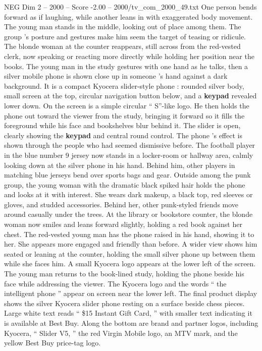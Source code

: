 \begin{textsample}{NEG Dim 2 – 2000 – Score -2.00 – 2000/tv\_com\_2000\_49.txt}
One person bends forward as if laughing, while another leans in with exaggerated body movement.
The young man stands in the middle, looking out of place among them.
The group ’s posture and gestures make him seem the target of teasing or ridicule.
The blonde woman at the counter reappears, still across from the red-vested clerk, now speaking or reacting more directly while holding her position near the books.
The young man in the study gestures with one hand as he talks, then a silver mobile phone is shown close up in someone ’s hand against a dark background.
It is a compact Kyocera slider-style phone : rounded silver body, small screen at the top, circular navigation button below, and a \textbf{keypad} revealed lower down.
On the screen is a simple circular “ S”-like logo.
He then holds the phone out toward the viewer from the study, bringing it forward so it fills the foreground while his face and bookshelves blur behind it.
The slider is open, clearly showing the \textbf{keypad} and central round control.
The phone ’s effect is shown through the people who had seemed dismissive before.
The football player in the blue number 9 jersey now stands in a locker-room or hallway area, calmly looking down at the silver phone in his hand.
Behind him, other players in matching blue jerseys bend over sports bags and gear.
Outside among the punk group, the young woman with the dramatic black spiked hair holds the phone and looks at it with interest.
She wears dark makeup, a black top, red sleeves or gloves, and studded accessories.
Behind her, other punk-styled friends move around casually under the trees.
At the library or bookstore counter, the blonde woman now smiles and leans forward slightly, holding a red book against her chest.
The red-vested young man has the phone raised in his hand, showing it to her.
She appears more engaged and friendly than before.
A wider view shows him seated or leaning at the counter, holding the small silver phone up between them while she faces him.
A small Kyocera logo appears at the lower left of the screen.
The young man returns to the book-lined study, holding the phone beside his face while addressing the viewer.
The Kyocera logo and the words “ the intelligent phone ” appear on screen near the lower left.
The final product display shows the silver Kyocera slider phone resting on a surface beside chess pieces.
Large white text reads “ \$15 Instant Gift Card, ” with smaller text indicating it is available at Best Buy.
Along the bottom are brand and partner logos, including Kyocera, “ Slider V5, ” the red Virgin Mobile logo, an MTV mark, and the yellow Best Buy price-tag logo.

\end{textsample}
